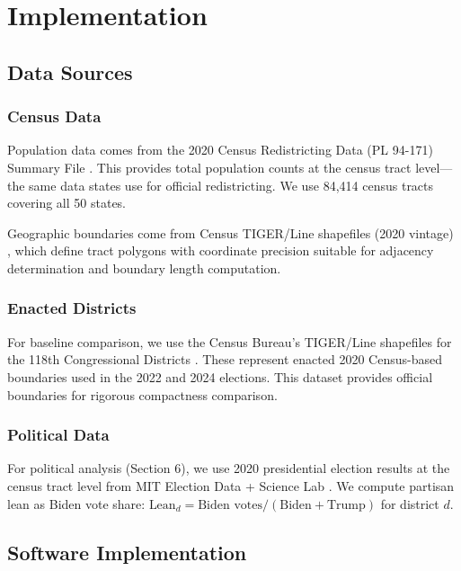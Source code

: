 \section{Implementation}

\subsection{Data Sources}

\subsubsection{Census Data}

Population data comes from the 2020 Census Redistricting Data (PL 94-171) Summary File \cite{census2020pl}. This provides total population counts at the census tract level—the same data states use for official redistricting. We use 84,414 census tracts covering all 50 states.

Geographic boundaries come from Census TIGER/Line shapefiles (2020 vintage) \cite{tiger-census}, which define tract polygons with coordinate precision suitable for adjacency determination and boundary length computation.

\subsubsection{Enacted Districts}

For baseline comparison, we use the Census Bureau's TIGER/Line shapefiles for the 118th Congressional Districts \cite{census2023tigerline}. These represent enacted 2020 Census-based boundaries used in the 2022 and 2024 elections. This dataset provides official boundaries for rigorous compactness comparison.

\subsubsection{Political Data}

For political analysis (Section 6), we use 2020 presidential election results at the census tract level from MIT Election Data + Science Lab \cite{mit-electionlab}. We compute partisan lean as Biden vote share: $\text{Lean}_d = \text{Biden votes} / (\text{Biden} + \text{Trump})$ for district $d$.

\subsection{Software Implementation}

